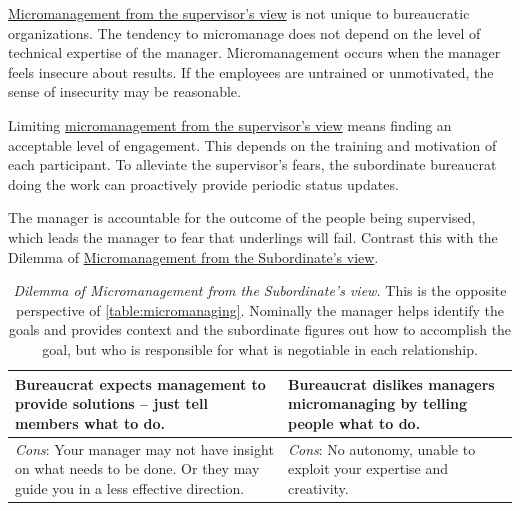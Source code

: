 \href{table:micromanaging}{Micromanagement from the supervisor's view} is not unique to bureaucratic organizations. The tendency to micromanage does not depend on the level of technical expertise of the manager. Micromanagement occurs when the manager feels insecure about results. If the employees are untrained or unmotivated, the sense of insecurity may be reasonable.

Limiting \href{table:micromanaging}{micromanagement from the supervisor's view} means finding an acceptable level of engagement. This depends on the training and motivation of each participant. To alleviate the supervisor's fears, the subordinate bureaucrat doing the work can proactively provide periodic status updates. 

The manager is accountable for the outcome of the people being supervised, which leads the manager to fear that underlings will fail.  Contrast this with the Dilemma of  \hyperref[table:solution-provider]{Micromanagement from the Subordinate’s view}.

\begin{center}
\begin{table}[H] %
\begin{tabular}{ | m{\dilemmatablewidth}| m{\dilemmatablewidth} | } 
  \hline
  \textbf{Bureaucrat expects management to provide solutions -- just tell members what to do.} & 
  \textbf{Bureaucrat dislikes managers micromanaging by telling people what to do.} \\ 
  \hline
  \textit{Cons}: Your manager may not have insight on what needs to be done. Or they may guide you in a less effective direction. &
  \textit{Cons}: No autonomy, unable to exploit your expertise and creativity. \\  
  \hline
\end{tabular}
\caption{\textit{Dilemma of Micromanagement from the Subordinate's view.}
This is the opposite perspective of \ref{table:micromanaging}. Nominally the manager helps identify the goals and provides context and the subordinate figures out how to accomplish the goal, but who is responsible for what is negotiable in each relationship.
}
\label{table:solution-provider}
\end{table}
\end{center}

